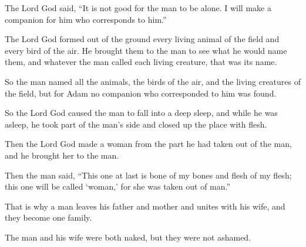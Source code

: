 \begin{scripture}
 The Lord God said, ``It is not good for the man to be alone. I will make a companion for him who corresponds to him.''
 The Lord God formed out of the ground every living animal of the field and every bird of the air. He brought them to the man to see what he would name them, and whatever the man called each living creature, that was its name.
 So the man named all the animals, the birds of the air, and the living creatures of the field, but for Adam no companion who corresponded to him was found.
 So the Lord God caused the man to fall into a deep sleep, and while he was asleep, he took part of the man's side and closed up the place with flesh.
 Then the Lord God made a woman from the part he had taken out of the man, and he brought her to the man.
\everypar{}

 Then the man said, ``This one at last is bone of my bones and flesh of my flesh; this one will be called `woman,' for she was taken out of man.''
\everypar{}

 That is why a man leaves his father and mother and unites with his wife, and they become one family.
 The man and his wife were both naked, but they were not ashamed.


\end{scripture}
